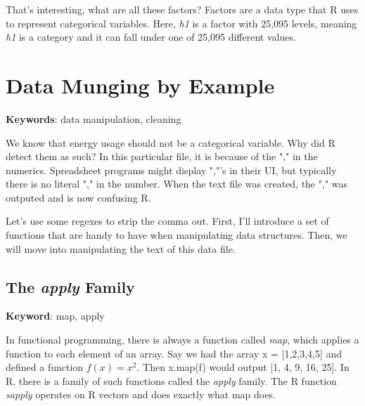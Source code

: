 \documentclass{article}
\begin{document}
\begin{Schunk}
\end{Schunk}

That's interesting, what are all these factors?  Factors are a data
type that R uses to represent categorical variables.  Here, \textit{h1}
is a factor with 25,095 levels, meaning \textit{h1} is a category and
it can fall under one of 25,095 different values.

\section{Data Munging by Example}
\textbf{Keywords}: data manipulation, cleaning

We know that energy usage should not be a categorical variable.  Why did
R detect them as such?  In this particular file, it is because of the ","
in the numerics.  Spreadsheet programs might display ","'s in their UI, but
typically there is no literal "," in the number.  When the text file was
created, the "," was outputed and is now confusing R.  

Let's use some regexes to strip the comma out.  First, I'll introduce
a set of functions that are handy to have when manipulating data structures.
Then, we will move into manipulating the text of this data file.

\subsection{The \textit{apply} Family}
\textbf{Keyword}: map, apply

In functional programming, there is always a function called \textit{map},
which applies a function to each element of an array.  Say we had the array
x = [1,2,3,4,5] and defined a function $f(x) = x^2$.  Then x.map(f)
would output [1, 4, 9, 16, 25].  In R, there is a family of such functions
called the \textit{apply} family.  The R function \textit{sapply} operates
on R vectors and does exactly what map does.
\end{document}
